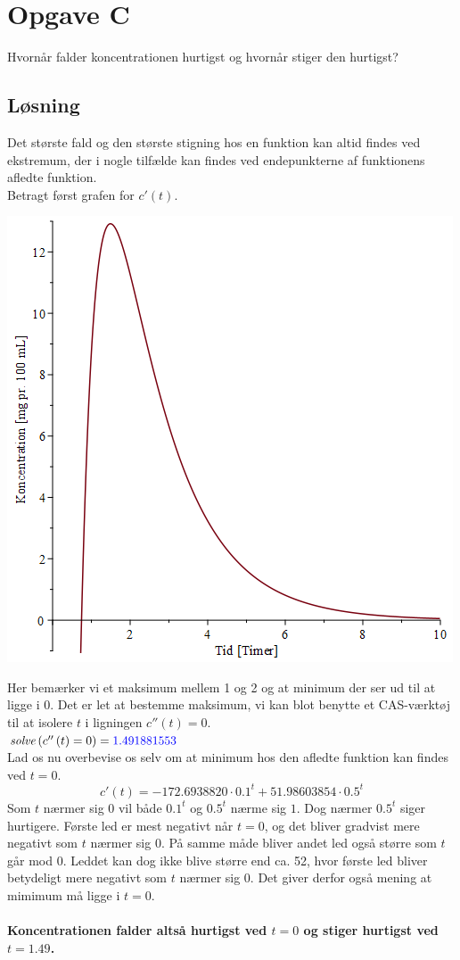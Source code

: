 \documentclass[a4paper, 11pt]{article}
\begin{document}
\section*{Opgave C} 
Hvornår falder koncentrationen hurtigst og hvornår stiger den hurtigst?
\subsection*{Løsning}
Det største fald og den største stigning hos en funktion kan altid findes ved ekstremum, der i nogle tilfælde kan findes ved endepunkterne af funktionens afledte funktion.\\
Betragt først grafen for \(c'(t)\).\\
\begin{center}
\includegraphics[width = 0.65 \textwidth]{AfledtGraf.png}
\end{center}
Her bemærker vi et maksimum mellem 1 og 2 og at minimum der ser ud til at ligge i 0. Det er let at bestemme maksimum, vi kan blot benytte et CAS-værktøj til at isolere \(t\) i ligningen \(c''(t)=0\).\\
\(\mathit{solve}\left(c''\left(t\right)=0\right)=\textcolor{blue}{1.491881553}\)\\
Lad os nu overbevise os selv om at minimum hos den afledte funktion kan findes ved \(t=0\). 
\[c'(t)=- 172.6938820 \cdot 0.1^{t}+ 51.98603854 \cdot 0.5^{t}\]
Som \(t\) nærmer sig \(0\) vil både \(0.1^t\) og \(0.5^t\) nærme sig \(1\). Dog nærmer \(0.5^t\) siger hurtigere. Første led er mest negativt når \(t=0\), og det bliver gradvist mere negativt som \(t\) nærmer sig 0. På samme måde bliver andet led også større som \(t\) går mod 0. Leddet kan dog ikke blive større end ca. 52, hvor første led bliver betydeligt mere negativt som \(t\) nærmer sig 0. Det giver derfor også mening at mimimum må ligge i \(t=0\).\\\\
\textbf{Koncentrationen falder altså hurtigst ved \(t=0\) og stiger hurtigst ved \(t=1.49\).}
\end{document}
